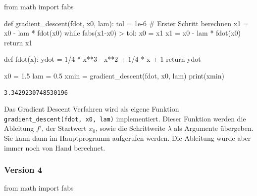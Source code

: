 \documentclass[
  letterpaper,
  DIV=11,
  oneside]{scrreprt}
\newenvironment{Shaded}{\begin{snugshade}}{\end{snugshade}}
\newcommand{\BuiltInTok}[1]{\textcolor[rgb]{0.00,0.23,0.31}{#1}}
\newcommand{\CommentTok}[1]{\textcolor[rgb]{0.37,0.37,0.37}{#1}}
\newcommand{\ControlFlowTok}[1]{\textcolor[rgb]{0.00,0.23,0.31}{#1}}
\newcommand{\DecValTok}[1]{\textcolor[rgb]{0.68,0.00,0.00}{#1}}
\newcommand{\FloatTok}[1]{\textcolor[rgb]{0.68,0.00,0.00}{#1}}
\newcommand{\ImportTok}[1]{\textcolor[rgb]{0.00,0.46,0.62}{#1}}
\newcommand{\KeywordTok}[1]{\textcolor[rgb]{0.00,0.23,0.31}{#1}}
\newcommand{\NormalTok}[1]{\textcolor[rgb]{0.00,0.23,0.31}{#1}}
\newcommand{\OperatorTok}[1]{\textcolor[rgb]{0.37,0.37,0.37}{#1}}
\theoremstyle{definition}
\theoremstyle{definition}
\theoremstyle{remark}
\begin{document}
\begin{tcolorbox}
\begin{Shaded}
\begin{Highlighting}[]
\ImportTok{from}\NormalTok{ math }\ImportTok{import}\NormalTok{ fabs}

\KeywordTok{def}\NormalTok{ gradient\_descent(fdot, x0, lam):}
\NormalTok{    tol }\OperatorTok{=} \FloatTok{1e{-}6}
    \CommentTok{\# Erster Schritt berechnen}
\NormalTok{    x1 }\OperatorTok{=}\NormalTok{ x0 }\OperatorTok{{-}}\NormalTok{ lam }\OperatorTok{*}\NormalTok{ fdot(x0)}
    \ControlFlowTok{while}\NormalTok{ fabs(x1}\OperatorTok{{-}}\NormalTok{x0) }\OperatorTok{\textgreater{}}\NormalTok{ tol:}
\NormalTok{        x0 }\OperatorTok{=}\NormalTok{ x1}
\NormalTok{        x1 }\OperatorTok{=}\NormalTok{ x0 }\OperatorTok{{-}}\NormalTok{ lam }\OperatorTok{*}\NormalTok{ fdot(x0)}
    \ControlFlowTok{return}\NormalTok{ x1}

\KeywordTok{def}\NormalTok{ fdot(x):}
\NormalTok{    ydot }\OperatorTok{=} \DecValTok{1}\OperatorTok{/}\DecValTok{4} \OperatorTok{*}\NormalTok{ x}\OperatorTok{**}\DecValTok{3} \OperatorTok{{-}}\NormalTok{ x}\OperatorTok{**}\DecValTok{2} \OperatorTok{+} \DecValTok{1}\OperatorTok{/}\DecValTok{4} \OperatorTok{*}\NormalTok{ x }\OperatorTok{+} \DecValTok{1}
    \ControlFlowTok{return}\NormalTok{ ydot}

\NormalTok{x0 }\OperatorTok{=} \FloatTok{1.5}
\NormalTok{lam }\OperatorTok{=} \FloatTok{0.5}
\NormalTok{xmin }\OperatorTok{=}\NormalTok{ gradient\_descent(fdot, x0, lam)}
\BuiltInTok{print}\NormalTok{(xmin)}
\end{Highlighting}
\end{Shaded}

\begin{verbatim}
3.3429230748530196
\end{verbatim}

Das Gradient Descent Verfahren wird als eigene Funktion
\texttt{gradient\_descent(fdot,\ x0,\ lam)} implementiert. Dieser
Funktion werden die Ableitung \(f'\), der Startwert \(x_0\), sowie die
Schrittweite \(\lambda\) als Argumente übergeben. Sie kann dann im
Hauptprogramm aufgerufen werden. Die Ableitung wurde aber immer noch von
Hand berechnet.

\hypertarget{version-4-1}{%
\subsubsection{Version 4}\label{version-4-1}}

\begin{Shaded}
\begin{Highlighting}[]
\ImportTok{from}\NormalTok{ math }\ImportTok{import}\NormalTok{ fabs}


\end{Highlighting}
\end{Shaded}
\end{tcolorbox}
\end{document}
